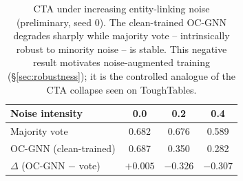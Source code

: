 \begin{table}[t]
\centering
\caption{CTA under increasing entity-linking noise (preliminary, seed 0). The
clean-trained OC-GNN degrades sharply while majority vote -- intrinsically robust
to minority noise -- is stable. This negative result motivates noise-augmented
training (\S\ref{sec:robustness}); it is the controlled analogue of the CTA
collapse seen on ToughTables.}
\label{tab:robustness}
\begin{tabular}{lccc}
\toprule
Noise intensity & 0.0 & 0.2 & 0.4 \\
\midrule
Majority vote        & 0.682 & 0.676 & 0.589 \\
OC-GNN (clean-trained) & 0.687 & 0.350 & 0.282 \\
\midrule
$\Delta$ (OC-GNN $-$ vote) & $+0.005$ & $-0.326$ & $-0.307$ \\
\bottomrule
\end{tabular}
\end{table}
